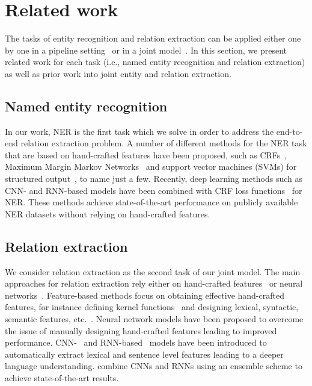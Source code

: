 \documentclass[review]{elsarticle}
\begin{document}
\section{Related work}
\label{sec:related_work}
\noindent The tasks of entity recognition and relation extraction can be applied either one by one in a pipeline setting~\citep{fundel:07,gurulingappa:12,bekoulis:17} or in a joint model~\citep{miwa:14,miwa:16,bekoulis:18}.
In this section, we present related work for each task (i.e., named entity recognition and relation extraction) as well as prior work into joint entity and relation extraction. 



\subsection{Named entity recognition}
\label{sec:named_entity_recognition}
\noindent In our work, NER is the first task which we solve in order to address the end-to-end relation extraction problem. A number of different methods for the NER task that are based on hand-crafted features have been proposed, such as CRFs~\citep{crf:01}, Maximum Margin Markov Networks~\citep{taskar:04} and support vector machines (SVMs) for structured output~\citep{tsochantaridis:04}, to name just a few.
Recently, deep learning methods such as CNN- and RNN-based models have been combined with CRF loss functions~\citep{collobert:11,huang:15,lample:16,ma:16} for NER. These methods achieve state-of-the-art performance on publicly available NER datasets without relying on hand-crafted features. 




\subsection{Relation extraction}
\label{sec:relation_extraction}
\noindent We consider relation extraction as the second task of our joint model. The main approaches for relation extraction rely either on hand-crafted features~\citep{zelenko:03,kambhatla:04} or neural networks~\citep{socher:12,zeng:14}. Feature-based methods focus on obtaining effective hand-crafted features, for instance defining kernel functions~\citep{zelenko:03,culotta:04} and designing lexical, syntactic, semantic features, etc.~\citep{kambhatla:04,rink:10}. 
Neural network models have been proposed to overcome the issue of manually designing hand-crafted features leading to improved performance. 
CNN-~\citep{zeng:14,xu:15b,santos:15} and RNN-based~\citep{socher:13,zhang:15,xu:15a} models have been introduced to automatically extract lexical and sentence level features leading to a deeper language understanding. \cite{vu:16} combine CNNs and RNNs
using an ensemble scheme to achieve state-of-the-art results.
\end{document}
